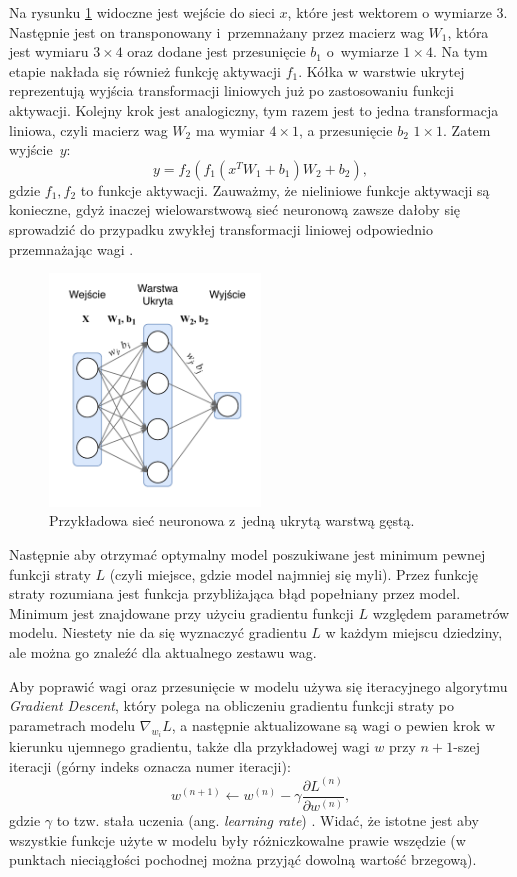 \documentclass{pracalicmgr}
\begin{document}
	 Na rysunku \ref{fig:simple} widoczne jest wejście do sieci $x$, które jest wektorem o wymiarze 3. Następnie jest on transponowany i~przemnażany przez macierz wag $W_1$, która jest wymiaru $3\times4$ oraz dodane jest przesunięcie $b_1$ o~wymiarze $1\times4$. Na tym etapie nakłada się również funkcję aktywacji $f_1$. Kółka w warstwie ukrytej reprezentują wyjścia transformacji liniowych już po zastosowaniu funkcji aktywacji. Kolejny krok jest analogiczny, tym razem jest to jedna transformacja liniowa, czyli macierz wag $W_2$ ma wymiar $4\times1$, a przesunięcie $b_2$ $1\times1$. Zatem wyjście~$y$: $$y = f_2\left(f_1(x^TW_1 + b_1)W_2 + b_2\right),$$ gdzie $f_1, f_2$ to funkcje aktywacji. Zauważmy, że nieliniowe funkcje aktywacji są konieczne, gdyż inaczej wielowarstwową sieć neuronową zawsze dałoby się sprowadzić do przypadku zwykłej transformacji liniowej odpowiednio przemnażając wagi \cite{dl}.
	
	\begin{figure}[H]
	\centering
	\includegraphics[width=0.5\textwidth]{simple_nn.pdf}
	\caption{Przykładowa sieć neuronowa z~jedną ukrytą warstwą gęstą.}
	\label{fig:simple}
	\end{figure}
	
	Następnie aby otrzymać optymalny model poszukiwane jest minimum pewnej funkcji straty $L$ (czyli miejsce, gdzie model najmniej się myli). Przez funkcję straty rozumiana jest funkcja przybliżająca błąd popełniany przez model. Minimum jest znajdowane przy użyciu gradientu funkcji $L$ względem parametrów modelu. Niestety nie da się wyznaczyć gradientu $L$ w każdym miejscu dziedziny, ale można go znaleźć dla aktualnego zestawu wag. 
	
	Aby poprawić wagi oraz przesunięcie w modelu używa się iteracyjnego algorytmu \textit{Gradient Descent}, który polega na obliczeniu gradientu funkcji straty po parametrach modelu $\nabla_{w_i}L$, a następnie aktualizowane są wagi o pewien krok w kierunku ujemnego gradientu, także dla przykładowej wagi $w$ przy $n+1$-szej iteracji (górny indeks oznacza numer iteracji): $$w^{(n+1)} \leftarrow w^{(n)} - \gamma \frac{\partial L^{(n)}}{\partial w^{(n)}},$$ gdzie $\gamma$ to tzw. stała uczenia (ang. \textit{learning rate}) \cite{dl}. Widać, że istotne jest aby wszystkie funkcje użyte w modelu były różniczkowalne prawie wszędzie (w punktach nieciągłości pochodnej można przyjąć dowolną wartość brzegową). 
	
\end{document}
